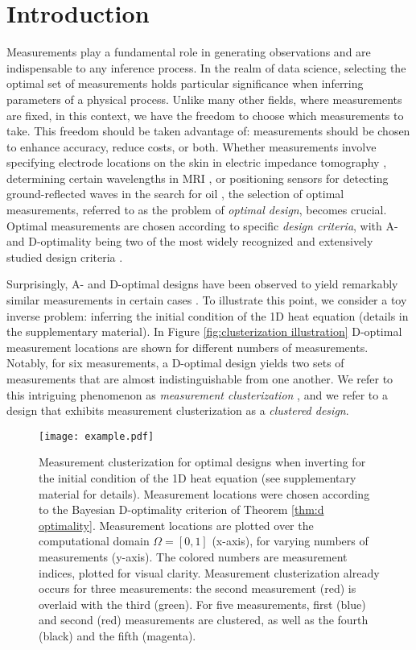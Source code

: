 \section{Introduction}\label{section:intro}
Measurements play a fundamental role in generating observations and
are indispensable to any inference process. In the realm of data
science, selecting the optimal set of measurements holds particular
significance when inferring parameters of a physical process. Unlike
many other fields, where measurements are fixed, in this context, we
have the freedom to choose which measurements to take. This freedom
should be taken advantage of: measurements should be chosen to enhance
accuracy, reduce costs, or both. Whether measurements involve
specifying electrode locations on the skin in electric impedance
tomography \cite{horesh2010impedance}, determining certain wavelengths
in MRI \cite{horesh2008mri}, or positioning sensors for detecting
ground-reflected waves in the search for oil
\cite{horesh2008borehole}, the selection of optimal measurements,
referred to as the problem of \emph{optimal design}, becomes
crucial. Optimal measurements are chosen according to specific
\emph{design criteria}, with A- and D-optimality being two of the most
widely recognized and extensively studied design criteria
\cite{Chaloner1995}.


Surprisingly, A- and D-optimal designs have been observed to yield
remarkably similar measurements in certain cases \cite{fedorov1996,
  hooker2009, fedorov1997, Ucinski05, neitzel2019sparse}. To
illustrate this point, we consider a toy inverse problem: inferring
the initial condition of the 1D heat equation (details in the
supplementary material). In Figure \ref{fig:clusterization
  illustration} D-optimal measurement locations are shown for
different numbers of measurements. Notably, for six measurements, a
D-optimal design yields two sets of measurements that are almost
indistinguishable from one another. We refer to this intriguing
phenomenon as \emph{measurement clusterization} \cite{Ucinski05}, and
we refer to a design that exhibits measurement clusterization as a
\emph{clustered design}.


\begin{figure}
    \centering
    \texttt{[image: example.pdf]}
    \caption{Measurement clusterization for optimal designs when
      inverting for the initial condition of the 1D heat equation (see
      supplementary material for details). Measurement locations were
      chosen according to the Bayesian D-optimality criterion of
      Theorem \ref{thm:d optimality}. Measurement locations are
      plotted over the computational domain $\Omega = [0, 1]$
      (x-axis), for varying numbers of measurements (y-axis). The
      colored numbers are measurement indices, plotted for visual
      clarity. Measurement clusterization already occurs for three
      measurements: the second measurement (red) is overlaid with the
      third (green). For five measurements, first (blue) and second
      (red) measurements are clustered, as well as the fourth (black)
      and the fifth (magenta).}
  \label{fig:clusterization illustration}
\end{figure}


